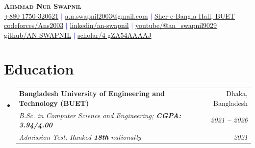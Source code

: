 \documentclass[letterpaper,11pt]{article}
\makeatletter
\newcommand{\resumeEducationHeading}[6]{
  \vspace{-2pt}\item
    \begin{tabular*}{0.97\textwidth}[t]{l@{\extracolsep{\fill}}r}
      \textbf{#1} & #2 \\
      \textit{\small#3} & \textit{\small #4} \\
      \textit{\small#5} & \textit{\small #6} \\
    \end{tabular*}\vspace{-5pt}
}
\newcommand{\resumeSubHeadingListStart}{\begin{itemize}[leftmargin=0.15in, label={}]}
\newcommand{\resumeSubHeadingListEnd}{\end{itemize}}
\makeatother
\begin{document}

\begin{center}
    \textbf{\Huge \scshape Ahmmad Nur Swapnil} \\ \vspace{3pt}
    \small
    \textcolor{blue}{
    \faMobile \hspace{.5pt} \href{tel:+8801750320621}{+880 1750-320621}
    $|$
    \faAt \hspace{.5pt} \href{mailto:a.n.swapnil2003@gmail.com}{a.n.swapnil2003@gmail.com}
    $|$
    \faMapMarker \hspace{.5pt} \href{https://maps.app.goo.gl/Mqme6DagoeqviF6h8}{Sher-e-Bangla Hall, BUET}
    \\ \vspace{1pt}
    \faCode \hspace{.5pt} \href{https://codeforces.com/profile/Ans2003}{codeforces/Ans2003}
    $|$
    \faLinkedin \hspace{.5pt} \href{https://www.linkedin.com/in/an-swapnil}{linkedin/an-swapnil}
    $|$
    \faYoutube \hspace{.5pt} \href{https://www.youtube.com/@an_swapnil9029}{youtube/@an\_swapnil9029}
    \\ \vspace{1pt}
    \faGithub \hspace{.5pt} \href{https://github.com/AN-SWAPNIL}{github/AN-SWAPNIL}
    $|$
    \faGraduationCap \hspace{.5pt} \href{https://scholar.google.com/citations?user=4-gZA54AAAAJ}{scholar/4-gZA54AAAAJ}
    }
\end{center}



\section{Education}
  \vspace{3pt}
  \resumeSubHeadingListStart
    
    \resumeEducationHeading
      {Bangladesh University of Engineering and Technology (BUET)}{Dhaka, Bangladesh}
      {B.Sc. in Computer Science and Engineering;   \textbf{CGPA: 3.94/4.00}}{2021 \textbf{--} 2026}
      {Admission Test: Ranked \textbf{18th} nationally}{2021}

  \resumeSubHeadingListEnd



\end{document}
